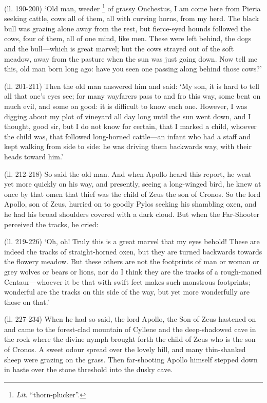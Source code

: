 (ll. 190-200) ‘Old man, weeder \footnote{\emph{Lit}.
“thorn-plucker”.} of grassy
Onchestus, I am come here from Pieria seeking cattle, cows all of them, all
with curving horns, from my herd. The black bull was grazing alone away from
the rest, but fierce-eyed hounds followed the cows, four of them, all of one
mind, like men. These were left behind, the dogs and the bull—which is
great marvel; but the cows strayed out of the soft meadow, away from the
pasture when the sun was just going down. Now tell me this, old man born long
ago: have you seen one passing along behind those cows?’

(ll. 201-211) Then the old man answered him and said: ‘My son, it is hard
to tell all that one’s eyes see; for many wayfarers pass to and fro this
way, some bent on much evil, and some on good: it is difficult to know each
one. However, I was digging about my plot of vineyard all day long until the
sun went down, and I thought, good sir, but I do not know for certain, that I
marked a child, whoever the child was, that followed long-horned
cattle—an infant who had a staff and kept walking from side to side: he
was driving them backwards way, with their heads toward him.’

(ll. 212-218) So said the old man. And when Apollo heard this report, he went
yet more quickly on his way, and presently, seeing a long-winged bird, he knew
at once by that omen that thief was the child of Zeus the son of Cronos. So the
lord Apollo, son of Zeus, hurried on to goodly Pylos seeking his shambling
oxen, and he had his broad shoulders covered with a dark cloud. But when the
Far-Shooter perceived the tracks, he cried:

(ll. 219-226) ‘Oh, oh! Truly this is a great marvel that my eyes behold!
These are indeed the tracks of straight-horned oxen, but they are turned
backwards towards the flowery meadow. But these others are not the footprints
of man or woman or grey wolves or bears or lions, nor do I think they are the
tracks of a rough-maned Centaur—whoever it be that with swift feet makes
such monstrous footprints; wonderful are the tracks on this side of the way,
but yet more wonderfully are those on that.’

(ll. 227-234) When he had so said, the lord Apollo, the Son of Zeus hastened on
and came to the forest-clad mountain of Cyllene and the deep-shadowed cave in
the rock where the divine nymph brought forth the child of Zeus who is the son
of Cronos. A sweet odour spread over the lovely hill, and many thin-shanked
sheep were grazing on the grass. Then far-shooting Apollo himself stepped down
in haste over the stone threshold into the dusky cave.

